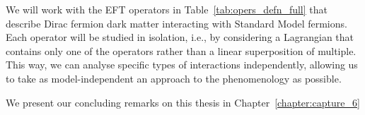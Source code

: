 We will work with the EFT operators in Table~\ref{tab:opers_defn_full} that describe Dirac fermion dark matter interacting with Standard Model fermions. Each operator will be studied in isolation, i.e., by considering a Lagrangian that contains only one of the operators rather than a linear superposition of multiple. This way, we can analyse specific types of interactions independently, allowing us to take as model-independent an approach to the phenomenology as possible. 

We present our concluding remarks on this thesis in Chapter~\ref{chapter:capture_6}